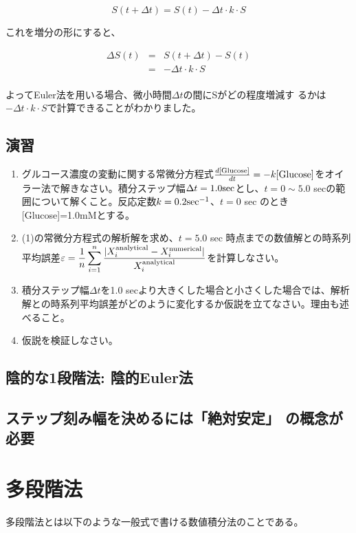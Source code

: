 \[S(t+\Delta t) = S(t) - \Delta t \cdot k \cdot S\]

これを増分の形にすると、

\begin{eqnarray*}
\Delta S(t) & = & S(t+\Delta t) - S(t)\\
            & = & - \Delta t \cdot k \cdot S\\
\end{eqnarray*}

よってEuler法を用いる場合、微小時間\(\Delta t\)の間にSがどの程度増減す
るかは\(- \Delta t \cdot k \cdot S\)で計算できることがわかりました。\\

\subsection{演習}
\begin{enumerate}
\item グルコース濃度の変動に関する常微分方程式\(\frac{d{\rm [Glucose]}}{dt}=-k{\rm [Glucose]}\)をオイラー法で解きなさい。積分ステップ幅\(\Delta t=1.0 {\rm sec}\)とし、\(t=0 \sim 5.0\) secの範囲について解くこと。反応定数\(k=0.2 {\rm sec}^{-1}\)、\(t=0\) sec のとき[Glucose]=1.0mMとする。
\item (1)の常微分方程式の解析解を求め、\(t = 5.0\) sec 時点までの数値解との時系列平均誤差\(\displaystyle\varepsilon=\frac{1}{n}\sum_{i=1}^n\frac{|X^{\rm analytical}_i - X^{\rm numerical}_i|}{ X^{\rm analytical}_i}\)を計算しなさい。
\item 積分ステップ幅\(\Delta t\)を1.0 secより大きくした場合と小さくした場合では、解析解との時系列平均誤差がどのように変化するか仮説を立てなさい。理由も述べること。
\item 仮説を検証しなさい。
\end{enumerate}

\subsection{陰的な1段階法: 陰的Euler法}

\subsection{ステップ刻み幅を決めるには「絶対安定」 の概念が必要}



\section{多段階法}
多段階法とは以下のような一般式で書ける数値積分法のことである。

